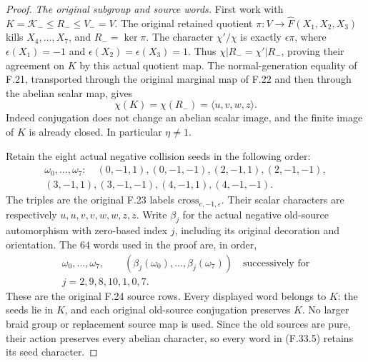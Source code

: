\begin{proof}
\emph{The original subgroup and source words.}
First work with
$K=\mathcal K_-\le R_-\le V_-=V$.
The original retained quotient
$\pi:V\to\widehat F(X_1,X_2,X_3)$ kills
$X_4,\ldots,X_7$, and $R_-=\ker\pi$.
The character $\chi'/\chi$ is exactly
$\epsilon\pi$, where
$\epsilon(X_1)=-1$ and
$\epsilon(X_2)=\epsilon(X_3)=1$.
Thus $\chi|R_-=\chi'|R_-$, proving their
agreement on $K$ by this actual quotient map.
The normal-generation equality of F.21,
transported through the original marginal
map of F.22 and then through the abelian
scalar map, gives
\[
       \chi(K)=\chi(R_-)=\langle u,v,w,z\rangle.
                                                               \tag{F.33.3}
\]
Indeed conjugation does not change an
abelian scalar image, and the finite image
of $K$ is already closed. In particular
$\eta\ne1$.

Retain the eight actual negative collision
seeds in the following order:
\[
 \begin{gathered}
 \omega_0,\ldots,\omega_7:\quad
 (0,-1,1),(0,-1,-1),(2,-1,1),(2,-1,-1),\\
 (3,-1,1),(3,-1,-1),(4,-1,1),(4,-1,-1).
 \end{gathered}                                                \tag{F.33.4}
\]
The triples are the original F.23 labels
$\mathrm{cross}_{e,-1,\varepsilon}$.
Their scalar characters are respectively
$u,u,v,v,w,w,z,z$.
Write $\beta_j$ for the actual negative
old-source automorphism with zero-based
index $j$, including its original
decoration and orientation. The $64$ words
used in the proof are, in order,
\[
 \begin{gathered}
 \omega_0,\ldots,\omega_7,\qquad
 (\beta_j(\omega_0),\ldots,\beta_j(\omega_7))
       \quad\text{successively for}\\
                         j=2,9,8,10,1,0,7.
 \end{gathered}                                                \tag{F.33.5}
\]
These are the original F.24 source rows.
Every displayed word belongs to $K$:
the seeds lie in $K$, and each original
old-source conjugation preserves $K$.
No larger braid group or replacement
source map is used. Since the old sources
are pure, their action preserves every
abelian character, so every word in
(F.33.5) retains its seed character.


\end{proof}
